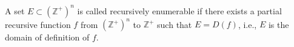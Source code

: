 A set $E \subset (\mathbb{Z}^+)^n$ is called recursively enumerable if there exists a partial recursive function $f$ from $(\mathbb{Z}^+)^n$ to $\mathbb{Z}^+$ such that $E = D(f)$, i.e., $E$ is the domain of definition of $f$.
